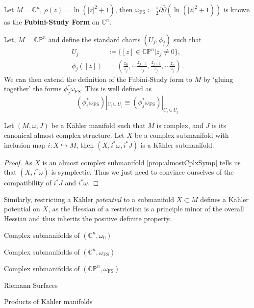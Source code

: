 \documentclass[11pt, final]{article}
\begin{document}
\begin{example}
	\begin{ronumerate}
		\item Let $M = \mathbb{C}^n$, $\rho(z) = \ln(|z|^2+1)$, then $ \omega_{\mathrm{FS}} \coloneqq \tfrac{i}{2} \partial \bar{\partial} (\ln(|z|^2+1))$ is known as the \textbf{Fubini-Study Form} on $\mathbb{C}^n$.
		\item Let, $M = \mathbb{CP}^n$ and define the standard charts $(U_j, \phi_j)$ such that 
			\begin{align*}
				U_j &\coloneqq \{ [z] \in \mathbb{CP}^n | z_j \neq 0 \},\\
				\phi_j([z]) &= \left( \tfrac{z_0}{z_j}, \cdots \tfrac{z_{j-1}}{z_j},\tfrac{z_{j+1}}{z_j}, \cdots \tfrac{z_n}{z_j}\right).
			\end{align*}
		We can then extend the definition of the Fubini-Study form to $M$ by `gluing together' the forms $\phi_j^*\omega_\mathrm{FS}$. This is well defined as 
		\begin{equation}
			\left(\phi_i^*\omega_\mathrm{FS}\right)|_{U_i \cup U_j} \equiv \left(\phi_j^*\omega_\mathrm{FS}\right)|_{U_i \cup U_j}
		\end{equation}
	\end{ronumerate}
\end{example}

\begin{prop}
	Let $(M,\omega,J)$ be a K\"ahler manifold such that $M$ is complex, and $J$ is its canonical almost complex structure. Let $X$ be a complex submanifold with inclusion map $i: X \hookrightarrow M$, then $(X,i^*\omega, i^*J)$ is a K\"ahler submanifold.
\end{prop}
\begin{proof}
	As $X$ is an almost complex submanifold \autoref{prop:almostCplxSymp} tells us that $(X,i^*\omega)$ is symplectic. Thus we just need to convince ourselves of the compatibility of $i^*J$ and $i^*\omega$. 
\end{proof}
\begin{remark}
	Similarly, restricting a K\"ahler \textit{potential} to a submanifold $X \subset M$ defines a K\"ahler potential on $X$, as the Hessian of a restriction is a principle minor of the overall Hessian and thus inherits the positive definite property.
\end{remark}

\begin{example}
	\begin{ronumerate}
		\item Complex submanifolds of $\left( \mathbb{C}^n,\omega_0 \right)$
		\item Complex submanifolds of $\left( \mathbb{C}^n,\omega_\mathrm{FS} \right)$
		\item Complex submanifolds of $\left( \mathbb{CP}^n,\omega_\mathrm{FS} \right)$
		\item Riemann Surfaces
		\item Products of K\"ahler manifolds
	\end{ronumerate}
\end{example}
\end{document}
